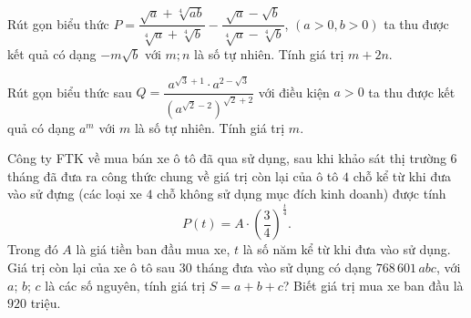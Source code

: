 \begin{ex}%
	Rút gọn biểu thức $P=\dfrac{\sqrt{a}+\sqrt[4]{a b}}{\sqrt[4]a+\sqrt[4]b}-\dfrac{\sqrt{a}-\sqrt{b}}{\sqrt[4]a-\sqrt[4]b}$, $(a > 0, b > 0)$ ta thu được kết quả  có dạng $-m \sqrt{b}$ với $m; n$ là số tự nhiên. Tính giá trị $m+2n$.
\end{ex}

\begin{ex}%
	Rút gọn biểu thức sau $Q=\dfrac{a^{\sqrt{3}+1}  \cdot a^{2-\sqrt{3}}}{\left(a^{\sqrt{2}-2}\right)^{\sqrt{2}+2}}$ với điều kiện $a > 0$ ta thu được kết quả có dạng $a^m$ với $m$ là số tự nhiên. Tính giá trị $m$.
\end{ex}

\begin{ex}%
	Công ty FTK về mua bán xe ô tô đã qua sử dụng, sau khi khảo sát thị  trường $6$ tháng đã đưa ra công thức chung về giá trị còn lại của ô tô $4$ chỗ kể từ khi đưa vào sử đựng (các loại xe $4$ chỗ không sử dụng mục đích kinh doanh) được tính
	$$P(t)=A \cdot\left(\dfrac{3}{4}\right)^{\tfrac{t}{4}}.$$ 
	Trong đó $A$ là giá tiền ban đầu mua xe, $t$ là số năm kể từ khi đưa vào sử dụng. Giá trị còn lại của xe ô tô sau $30$ tháng đưa vào sử dụng có dạng $768\,601\,abc$, với $a$; $b$; $c$ là các số nguyên, tính giá trị $S=a+b+c$? Biết giá trị mua xe  ban đầu là $920$ triệu.
\end{ex}

